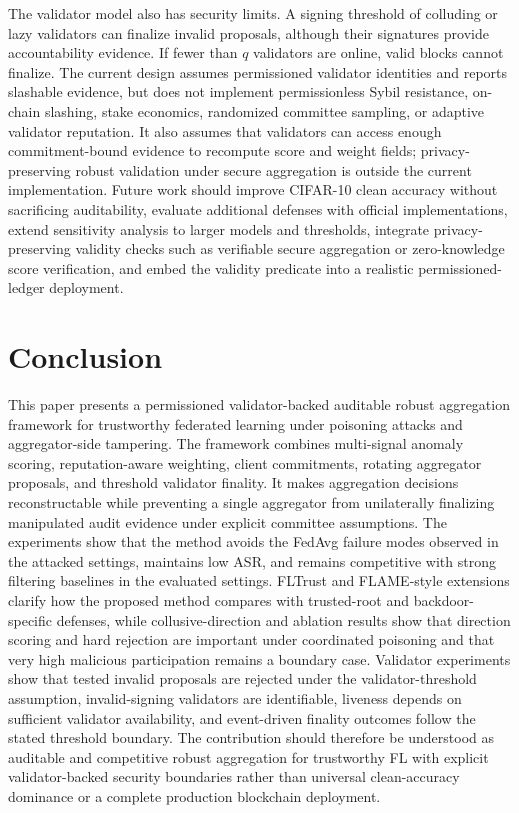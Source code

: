 \documentclass[preprint,12pt]{elsarticle}
\begin{document}
The validator model also has security limits. A signing threshold of colluding or lazy validators can finalize invalid proposals, although their signatures provide accountability evidence. If fewer than $q$ validators are online, valid blocks cannot finalize. The current design assumes permissioned validator identities and reports slashable evidence, but does not implement permissionless Sybil resistance, on-chain slashing, stake economics, randomized committee sampling, or adaptive validator reputation. It also assumes that validators can access enough commitment-bound evidence to recompute score and weight fields; privacy-preserving robust validation under secure aggregation is outside the current implementation. Future work should improve CIFAR-10 clean accuracy without sacrificing auditability, evaluate additional defenses with official implementations, extend sensitivity analysis to larger models and thresholds, integrate privacy-preserving validity checks such as verifiable secure aggregation or zero-knowledge score verification, and embed the validity predicate into a realistic permissioned-ledger deployment.

\section{Conclusion}

This paper presents a permissioned validator-backed auditable robust aggregation framework for trustworthy federated learning under poisoning attacks and aggregator-side tampering. The framework combines multi-signal anomaly scoring, reputation-aware weighting, client commitments, rotating aggregator proposals, and threshold validator finality. It makes aggregation decisions reconstructable while preventing a single aggregator from unilaterally finalizing manipulated audit evidence under explicit committee assumptions. The experiments show that the method avoids the FedAvg failure modes observed in the attacked settings, maintains low ASR, and remains competitive with strong filtering baselines in the evaluated settings. FLTrust and FLAME-style extensions clarify how the proposed method compares with trusted-root and backdoor-specific defenses, while collusive-direction and ablation results show that direction scoring and hard rejection are important under coordinated poisoning and that very high malicious participation remains a boundary case. Validator experiments show that tested invalid proposals are rejected under the validator-threshold assumption, invalid-signing validators are identifiable, liveness depends on sufficient validator availability, and event-driven finality outcomes follow the stated threshold boundary. The contribution should therefore be understood as auditable and competitive robust aggregation for trustworthy FL with explicit validator-backed security boundaries rather than universal clean-accuracy dominance or a complete production blockchain deployment.
\end{document}
